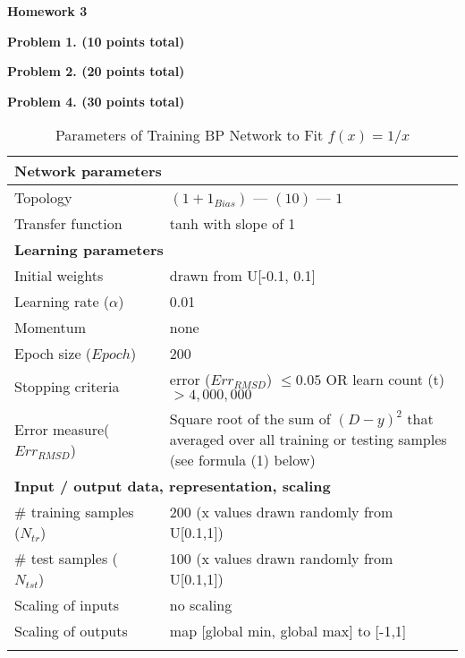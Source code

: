 \documentclass[epsfig]{article}
\def\bpar{\vskip26pt}
\def\npar{\vskip13pt}
\def\spar{\vskip10pt}
\begin{document}
\parindent=0pt


\null\bpar
\centerline{\bf Homework 3}
\npar

\npar



\bpar
{\bf Problem 1. (10 points total)}
\spar

{\bf Problem 2. (20 points total)}
\spar

{\bf Problem 4. (30 points total)}
\spar

\begin{table}[htbp] 
	\center
	\caption{Parameters of Training BP Network to Fit $f(x) = 1/x$}
	\label{tab:NP}


		\begin{tabular}{p{4cm} p{.05cm} p{8cm}}
			\toprule
			\multicolumn{3}{l}{\bf Network parameters} \\
			\bottomrule \noalign{\smallskip}
			Topology & & $(1 + 1_{Bias})$ --- $(10 )$ --- $1$ \\
			Transfer function & & tanh with slope of 1 \\
			\toprule
			\multicolumn{3}{l}{\bf Learning parameters} \\
			\bottomrule \noalign{\smallskip}
			Initial weights & & drawn from U[-0.1, 0.1] \\
			Learning rate ($\alpha$) & & 0.01 \\
			Momentum & & none\\
			Epoch size ($Epoch$)& &  200 \\
			Stopping criteria & &  error ($Err_{RMSD}$) $ \le 0.05 $ OR  learn count (t) $ > 4,000,000 $\\
			Error measure($Err_{RMSD}$) & &  Square root of the sum of $(D-y)^2$ that averaged over all training or testing samples (see formula (1) below)\\\toprule
			\multicolumn{3}{l}{\bf Input / output data, representation, scaling} \\
			\bottomrule \noalign{\smallskip}
			\# training samples ($N_{tr}$)& & 200 (x values drawn randomly from U[0.1,1])\\
			\# test samples ($N_{tst}$)& & 100 (x values drawn randomly from U[0.1,1])\\
			Scaling of inputs & &  no scaling \\
			Scaling of outputs & &  map [global min, global max] to [-1,1] \\
			
			\bottomrule \noalign{\smallskip}
			
		\end{tabular}

\end{table}
\end{document}
